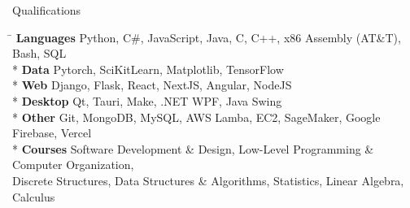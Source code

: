 \documentclass{article}
\newlength{\tabin}
\newlength{\secsep}
\newenvironment{tabbedsection}[1]{
  \begin{list}{}{
      \setlength{\itemsep}{0pt}
      \setlength{\labelsep}{0pt}
      \setlength{\labelwidth}{0pt}
      \setlength{\leftmargin}{\tabin}
      \setlength{\rightmargin}{\tabin}
      \setlength{\listparindent}{0pt}
      \setlength{\parsep}{0pt}
      \setlength{\parskip}{0pt}
      \setlength{\partopsep}{0pt}
      \setlength{\topsep}{#1}
    }
  \item[]
}{\end{list}}
\newenvironment{nospacetabbing}{
    \begin{tabbing}
}{\end{tabbing}\vspace{-1.6pt}}
\newenvironment{resume_section}[1]{
  \filbreak
  \vspace{2\secsep}
  {\color {MyDarkBlue}\textbf{\large #1}} \hrulefill
  \begin{tabbedsection}{\secsep}
}{\end{tabbedsection}}
\begin{document}
\begin{resume_section}{Qualifications}
  \begin {nospacetabbing}
      \hspace{2.5cm} \= \kill
      \textbf{Languages} \>Python, C\#, JavaScript, Java, C, C++, x86 Assembly (AT\&T), Bash, SQL\\* 
      \textbf{Data} \> Pytorch, SciKitLearn, Matplotlib, TensorFlow\\*
      \textbf{Web} \> Django, Flask, React, NextJS, Angular, NodeJS\\*
      \textbf{Desktop} \> Qt, Tauri, Make, .NET WPF, Java Swing\\*
      \textbf{Other} \> Git, MongoDB, MySQL, AWS Lamba, EC2, SageMaker, Google Firebase, Vercel \\*
      \textbf{Courses} \> Software Development \& Design, Low-Level Programming \& Computer Organization, \\
      \> Discrete Structures, Data Structures \& Algorithms, Statistics, Linear Algebra, Calculus
  \end {nospacetabbing}
\end{resume_section}
\end{document}
